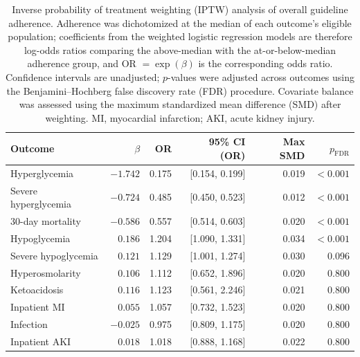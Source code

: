 \begin{table}[t]
\centering
\caption{Inverse probability of treatment weighting (IPTW) analysis of
overall guideline adherence. Adherence was dichotomized at the median of
each outcome's eligible population; coefficients from the weighted logistic
regression models are therefore log-odds ratios comparing the above-median
with the at-or-below-median adherence group, and OR $=\exp(\beta)$ is the
corresponding odds ratio. Confidence intervals are unadjusted; $p$-values
were adjusted across outcomes using the Benjamini--Hochberg false discovery
rate (FDR) procedure. Covariate balance was assessed using the maximum
standardized mean difference (SMD) after weighting. MI, myocardial
infarction; AKI, acute kidney injury.}
\label{tab:iptw-overall}

\small
\setlength{\tabcolsep}{4pt}

\begin{tabular}{lrrrrr}
\toprule
Outcome & $\beta$ & OR & 95\% CI (OR) & Max SMD & $p_{\mathrm{FDR}}$ \\
\midrule
Hyperglycemia
    & $-1.742$ & 0.175 & [0.154, 0.199] & 0.019 & $<0.001$ \\

Severe hyperglycemia
    & $-0.724$ & 0.485 & [0.450, 0.523] & 0.012 & $<0.001$ \\

30-day mortality
    & $-0.586$ & 0.557 & [0.514, 0.603] & 0.020 & $<0.001$ \\

Hypoglycemia
    & $0.186$ & 1.204 & [1.090, 1.331] & 0.034 & $<0.001$ \\

Severe hypoglycemia
    & $0.121$ & 1.129 & [1.001, 1.274] & 0.030 & 0.096 \\

Hyperosmolarity
    & $0.106$ & 1.112 & [0.652, 1.896] & 0.020 & 0.800 \\

Ketoacidosis
    & $0.116$ & 1.123 & [0.561, 2.246] & 0.021 & 0.800 \\

Inpatient MI
    & $0.055$ & 1.057 & [0.732, 1.523] & 0.020 & 0.800 \\

Infection
    & $-0.025$ & 0.975 & [0.809, 1.175] & 0.020 & 0.800 \\

Inpatient AKI
    & $0.018$ & 1.018 & [0.888, 1.168] & 0.022 & 0.800 \\

\bottomrule
\end{tabular}
\end{table}

